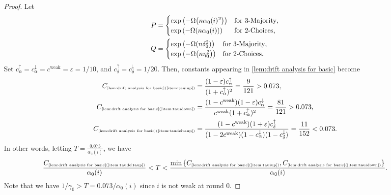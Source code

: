 \documentclass[letterpaper,11pt]{article}
\newcommand{\constref}[1]{C_{\mbox{\tiny\ref{#1}}}}
\newcommand{\constrefs}[2]{C_{\mbox{\tiny\ref{#1}(\ref{#2})}}}
\newcommand{\alphanorm}{\gamma}
\newcommand{\cweak}{c^{\mathrm{weak}}}
\newcommand{\calphaup}{c^{\uparrow}_\alpha}
\newcommand{\calphadown}{c^{\downarrow}_\alpha}
\newcommand{\cdeltaup}{c^{\uparrow}_\delta}
\newcommand{\cdeltadown}{c^{\downarrow}_\delta}
\newcommand{\ciup}{c_\alpha^{\uparrow}}
\begin{document}
\begin{proof}
  Let
  \begin{align*} 
     P &= \begin{cases}
      \exp\qty(-\Omega\qty(n\alpha_0(i)^2)) & \text{for 3-Majority},\\
      \exp\qty(-\Omega\qty(n\alpha_0(i)))   & \text{for 2-Choices},
     \end{cases}\\
     Q &= \begin{cases}
      \exp\qty( -\Omega(n\delta_0^2) )	& \text{for 3-Majority},\\
      \exp\qty( -\Omega\qty( n\eta_0^2)) & \text{for 2-Choices}.
     \end{cases}
  \end{align*}
  Set $\calphaup=\calphadown=\cweak=\varepsilon=1/10$, and $\cdeltaup=\cdeltadown=1/20$.
  Then, constants appearing in \cref{lem:drift analysis for basic} become
  \begin{align*}
    \constrefs{lem:drift analysis for basic}{item:tauiup} &= \frac{ (1 - \varepsilon) \ciup }{(1+\ciup)^2}=\frac{9}{121}>0.073,\\
    \constrefs{lem:drift analysis for basic}{item:tauidown} &= \frac{(1-\cweak)(1-\varepsilon)\calphadown}{\cweak (1+\ciup)^2}=\frac{81}{121}>0.073,\\
    \constrefs{lem:drift analysis for basic}{item:taudeltaup} &= \frac{(1-\cweak)(1+\varepsilon)\cdeltaup}{(1-2\cweak)(1-\calphadown)(1-\cdeltadown)}=\frac{11}{152}<0.073. 
  \end{align*}
  In other words, letting $T=\frac{0.073}{\alpha_0(i)}$, we have 
  \begin{align*} 
      \frac{\constrefs{lem:drift analysis for basic}{item:taudeltaup}}{\alpha_0(i)} < T < \frac{\min\qty{\constrefs{lem:drift analysis for basic}{item:tauiup}, \constrefs{lem:drift analysis for basic}{item:tauidown}}}{\alpha_0(i)}.
  \end{align*}
  Note that we have $1/\alphanorm_0>T=0.073/\alpha_0(i)$ since $i$ is not weak at round $0$.
  

\end{proof}
\end{document}
